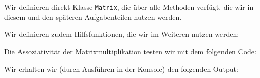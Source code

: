 \section{}

Wir definieren direkt Klasse \texttt{Matrix}, die über alle Methoden verfügt, die wir in diesem und den späteren Aufgabenteilen nutzen werden.



Wir definieren zudem Hilfsfunktionen, die wir im Weiteren nutzen werden:



Die Assoziativität der Matrixmultiplikation testen wir mit dem folgenden Code:



Wir erhalten wir (durch Ausführen in der Konsole) den folgenden Output:




